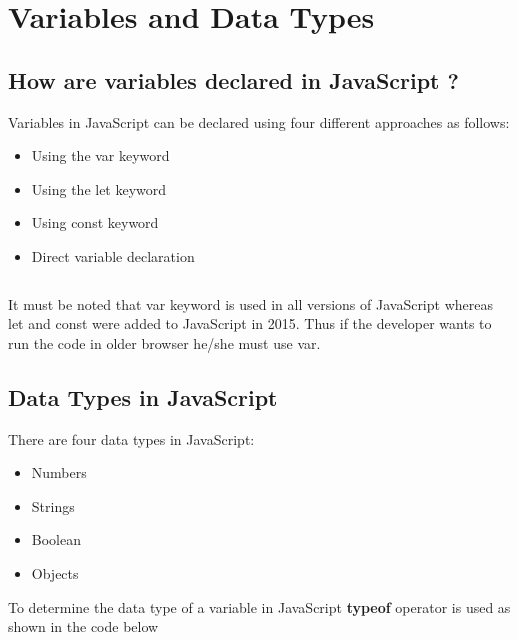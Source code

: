 \documentclass[twoside,12pt]{report}  %
\begin{document}
	
	\chapter{Variables and Data Types}
	
	
	\section{How are variables declared in JavaScript ?}
	Variables in JavaScript can be declared using four different approaches as follows:
	\begin{itemize}
		\item Using the var keyword
		\item Using the let keyword
		\item Using const keyword
		\item Direct variable declaration
	\end{itemize}	
	
	\begin{listing}[H]
		\inputminted[linenos, autogobble, bgcolor=myjsbackground]{JavaScript}{../codes/js_variables.js}
	\end{listing}

	\noindent 
	It must be noted that var keyword is used in all versions of JavaScript whereas let and const were added to JavaScript in 2015. Thus if the developer wants to run the code in older browser he/she must use var.
	
	\section{Data Types in JavaScript}
	
	There are four data types in JavaScript:
	\begin{itemize}
		\item Numbers
		\item Strings
		\item Boolean
		\item Objects
	\end{itemize}
	
	\noindent To determine the data type of a variable in JavaScript \textbf{typeof} operator is used as shown in the code below
	
	\begin{listing}[H]
		\inputminted[linenos, autogobble, bgcolor=myjsbackground]{JavaScript}{../codes/js_datatypes.js}
	\end{listing}
\end{document}
